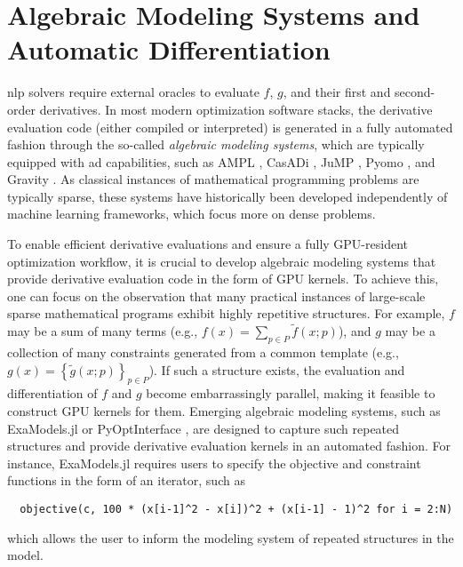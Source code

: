 \documentclass{article}
\begin{document}
\section{Algebraic Modeling Systems and Automatic Differentiation}\label{eqn:ad}
\Gls*{nlp} solvers require external oracles to evaluate $f$, $g$, and their first and second-order derivatives. In most modern optimization software stacks, the derivative evaluation code (either compiled or interpreted) is generated in a fully automated fashion through the so-called \emph{algebraic modeling systems}, which are typically equipped with \gls*{ad} capabilities, such as AMPL \cite{fourerModelingLanguageMathematical1990}, CasADi \cite{anderssonCasADiSoftwareFramework2019}, JuMP \cite{dunningJuMPModelingLanguage2017}, Pyomo \cite{hartPyomoModelingSolving2011}, and Gravity \cite{hijaziGravityMathematicalModeling2018}. As classical instances of mathematical programming problems are typically sparse, these systems have historically been developed independently of machine learning frameworks, which focus more on dense problems.

To enable efficient derivative evaluations and ensure a fully GPU-resident optimization workflow, it is crucial to develop algebraic modeling systems that provide derivative evaluation code in the form of GPU kernels. To achieve this, one can focus on the observation that many practical instances of large-scale sparse mathematical programs exhibit highly repetitive structures. For example, $f$ may be a sum of many terms (e.g., $f(x) = \sum_{p\in P} \widetilde{f}(x; p)$), and $g$ may be a collection of many constraints generated from a common template (e.g., $g(x) = \left\{\widetilde{g}(x; p)\right\}_{p\in P}$). If such a structure exists, the evaluation and differentiation of $f$ and $g$ become embarrassingly parallel, making it feasible to construct GPU kernels for them. Emerging algebraic modeling systems, such as ExaModels.jl \cite{shinAcceleratingOptimalPower2024} or PyOptInterface \cite{yangPyOptInterfaceDesignImplementation2024}, are designed to capture such repeated structures and provide derivative evaluation kernels in an automated fashion. For instance, ExaModels.jl requires users to specify the objective and constraint functions in the form of an iterator, such as
\begin{verbatim}
  objective(c, 100 * (x[i-1]^2 - x[i])^2 + (x[i-1] - 1)^2 for i = 2:N)
\end{verbatim}
which allows the user to inform the modeling system of repeated structures in the model.
\end{document}
